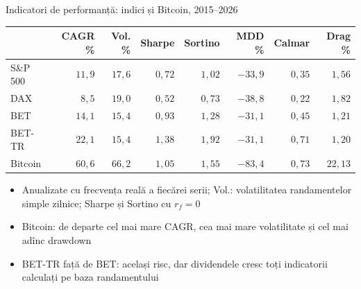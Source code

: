 \begin{frame}{Indicatori de performanță: indici și Bitcoin, 2015--2026}
\itemsize{\small}
\begin{center}
\footnotesize
\begin{tabular}{lrrrrrrr}
\toprule
& CAGR \% & Vol. \% & Sharpe & Sortino & MDD \% & Calmar & Drag \% \\
\midrule
S\&P 500 & $11{,}9$ & $17{,}6$ & $0{,}72$ & $1{,}02$ & $-33{,}9$ & $0{,}35$ & $1{,}56$ \\
DAX & $8{,}5$ & $19{,}0$ & $0{,}52$ & $0{,}73$ & $-38{,}8$ & $0{,}22$ & $1{,}82$ \\
BET & $14{,}1$ & $15{,}4$ & $0{,}93$ & $1{,}28$ & $-31{,}1$ & $0{,}45$ & $1{,}21$ \\
BET-TR & $22{,}1$ & $15{,}4$ & $1{,}38$ & $1{,}92$ & $-31{,}1$ & $0{,}71$ & $1{,}20$ \\
Bitcoin & $60{,}6$ & $66{,}2$ & $1{,}05$ & $1{,}55$ & $-83{,}4$ & $0{,}73$ & $22{,}13$ \\
\bottomrule
\end{tabular}
\end{center}
\begin{itemize}
    \item Anualizate cu frecvența reală a fiecărei serii; Vol.: volatilitatea randamentelor simple zilnice; Sharpe și Sortino cu $r_f = 0$
    \item Bitcoin: de departe cel mai mare CAGR, cea mai mare volatilitate și cel mai adînc drawdown
    \item BET-TR față de BET: același risc, dar dividendele cresc toți indicatorii calculați pe baza randamentului
\end{itemize}
\end{frame}


